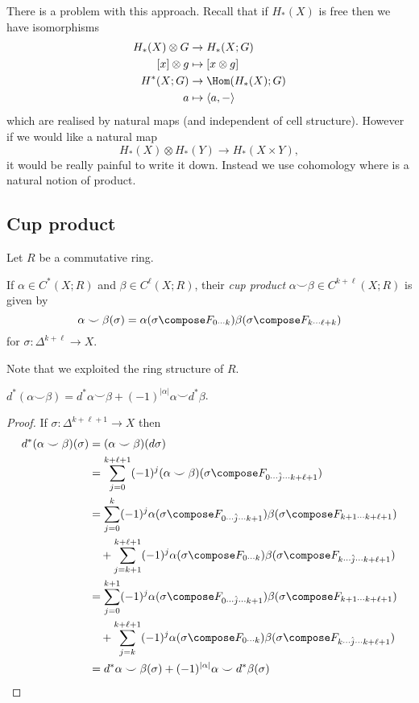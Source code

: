 \documentclass[a4paper]{article}
\newcommand*{\cp}{\smile} %
\begin{document}
There is a problem with this approach. Recall that if \(H_*(X)\) is free then we have isomorphisms
\begin{align*}
  H_*(X) \otimes G &\to H_*(X; G) \\
  [x] \otimes g &\mapsto [x \otimes g] \\
  H^*(X; G) &\to \Hom(H_*(X); G) \\
  a &\mapsto \langle a, - \rangle
\end{align*}
which are realised by natural maps (and independent of cell structure). However if we would like a natural map
\[
  H_*(X) \otimes H_*(Y) \to H_*(X \times Y),
\]
it would be really painful to write it down. Instead we use cohomology where is a natural notion of product.

\subsection{Cup product}

Let \(R\) be a commutative ring.

\begin{definition}
  If \(\alpha \in C^*(X; R)\) and \(\beta \in C^\ell(X; R)\), their \emph{cup product} \(\alpha \cp \beta \in C^{k + \ell}(X; R)\) is given by
  \[
    \alpha \cp \beta(\sigma) = \alpha(\sigma \compose F_{0 \cdots k}) \beta(\sigma \compose F_{k \cdots \ell + k})
  \]
  for \(\sigma: \Delta^{k + \ell} \to X\).
\end{definition}

Note that we exploited the ring structure of \(R\).

\begin{lemma}
  \(d^*(\alpha \cp \beta) = d^* \alpha \cp \beta + (-1)^{|\alpha|} \alpha \cp d^*\beta\).
\end{lemma}

\begin{proof}
  If \(\sigma: \Delta^{k + \ell + 1} \to X\) then
  \begin{align*}
    d^*(\alpha \cp \beta)(\sigma)
    &= (\alpha \cp \beta) (d\sigma) \\
    &= \sum_{j = 0}^{k + \ell + 1} (-1)^j (\alpha \cp \beta) (\sigma \compose F_{0 \cdots \hat j \cdots k + \ell + 1}) \\
    &= \sum_{j = 0}^k (-1)^j \alpha(\sigma \compose F_{0 \cdots \hat j \cdots k + 1}) \beta(\sigma \compose F_{k + 1 \cdots k + \ell + 1}) \\
    &\quad+ \sum_{j = k + 1}^{k + \ell + 1} (-1)^j \alpha(\sigma \compose F_{0 \cdots k}) \beta(\sigma \compose F_{k \cdots \hat j \cdots k + \ell + 1}) \\
    &= \sum_{j = 0}^{k + 1} (-1)^j \alpha(\sigma \compose F_{0 \cdots \hat j \cdots k + 1}) \beta(\sigma \compose F_{k + 1 \cdots k + \ell + 1}) \\
    &\quad+ \sum_{j = k}^{k + \ell + 1} (-1)^j \alpha(\sigma \compose F_{0 \cdots k}) \beta(\sigma \compose F_{k \cdots \hat j \cdots k + \ell + 1}) \\
    &= d^* \alpha \cp \beta (\sigma) + (-1)^{|\alpha|} \alpha \cp d^*\beta (\sigma)
  \end{align*}
\end{proof}
\end{document}
